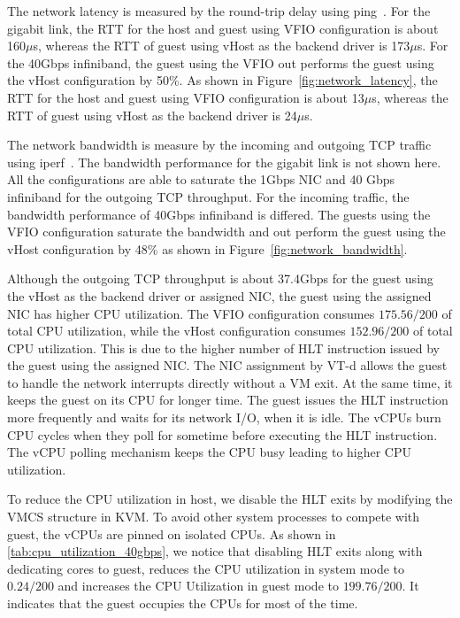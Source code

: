 The network latency is measured by the round-trip delay using
ping~\cite{ping}. For the gigabit link, the RTT for the host
and guest using VFIO configuration is about 160$\mu$s, whereas
the RTT of guest using vHost as the backend driver is
173$\mu$s. For the 40Gbps infiniband, the guest using the VFIO
out performs the guest using the vHost configuration by 50\%.
As shown in Figure~\ref{fig:network_latency}, the RTT for the
host and guest using VFIO configuration is about 13$\mu$s,
whereas the RTT of guest using vHost as the backend driver is
24$\mu$s.

The network bandwidth is measure by the incoming and outgoing
TCP traffic using iperf~\cite{iperf}. The bandwidth
performance for the gigabit link is not shown here. All the
configurations are able to saturate the 1Gbps NIC and 40 Gbps
infiniband for the outgoing TCP throughput. For the incoming
traffic, the bandwidth performance of 40Gbps infiniband is
differed. The guests using the VFIO configuration saturate the
bandwidth and out perform the guest using the vHost
configuration by 48\% as shown in
Figure~\ref{fig:network_bandwidth}.

Although the outgoing TCP throughput is about 37.4Gbps for the
guest using the vHost as the backend driver or assigned NIC,
the guest using the assigned NIC has higher CPU utilization.
The VFIO configuration consumes $175.56/200$ of total CPU
utilization, while the vHost configuration consumes
$152.96/200$ of total CPU utilization. This is due to the
higher number of HLT instruction issued by the guest using the
assigned NIC. The NIC assignment by VT-d allows the guest to
handle the network interrupts directly without a VM exit. At
the same time, it keeps the guest on its CPU for longer time.
The guest issues the HLT instruction more frequently and waits
for its network I/O, when it is idle. The vCPUs burn CPU
cycles when they poll for sometime before executing the HLT
instruction. The vCPU polling mechanism keeps the CPU busy
leading to higher CPU utilization.

To reduce the CPU utilization in host, we disable the HLT
exits by modifying the VMCS structure in KVM. To avoid other
system processes to compete with guest, the vCPUs are pinned
on isolated CPUs. As shown in
\ref{tab:cpu_utilization_40gbps}, we notice that disabling HLT
exits along with dedicating cores to guest, reduces the CPU
utilization in system mode to $0.24/200$ and increases the CPU
Utilization in guest mode to $199.76/200$. It indicates that
the guest occupies the CPUs for most of the time.

